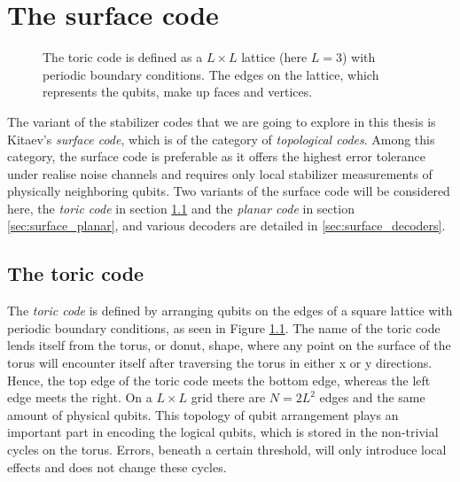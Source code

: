 

\chapter{The surface code}

\begin{figure}[h]
  \centering
  \caption{The toric code is defined as a $L\times L$ lattice (here $L=3$) with periodic boundary conditions. The edges on the lattice, which represents the qubits, make up faces and vertices.}\label{sf:fig_toriclattice}
\end{figure}

The variant of the stabilizer codes that we are going to explore in this thesis is Kitaev's \emph{surface code}, which is of the category of \emph{topological codes}. Among this category, the surface code is preferable as it offers the highest error tolerance under realise noise channels and requires only local stabilizer measurements of physically neighboring qubits. Two variants of the surface code will be considered here, the \emph{toric code} in section \ref{sec:surface_toric} and the \emph{planar code} in section \ref{sec:surface_planar}, and various decoders are detailed in \ref{sec:surface_decoders}.


\section{The toric code}\label{sec:surface_toric}

The \emph{toric code} is defined by arranging qubits on the edges of a square lattice with periodic boundary conditions, as seen in Figure \ref{sf:fig_toriclattice}. The name of the toric code lends itself from the torus, or donut, shape, where any point on the surface of the torus will encounter itself after traversing the torus in either x or y directions. Hence, the top edge of the toric code meets the bottom edge, whereas the left edge meets the right. On a $L\times L$ grid there are $N = 2L^2$ edges and the same amount of physical qubits. This topology of qubit arrangement plays an important part in encoding the logical qubits, which is stored in the non-trivial cycles on the torus. Errors, beneath a certain threshold, will only introduce local effects and does not change these cycles.

